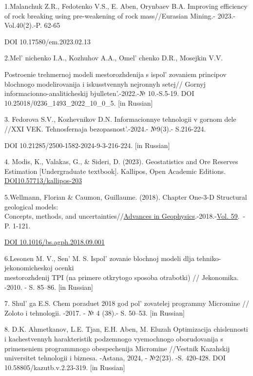 \begin{references}

1.Malanchuk Z.R., Fedotenko V.S., E. Aben, Orynbaev B.A. Improving
efficiency of rock breaking using pre-weakening of rock mass//Eurasian
Mining.- 2023.-Vol.40(2).-P. 62-65

DOI 10.17580/em.2023.02.13

2.Mel' nichenko I.A., Kozhuhov A.A.,
Omel' chenko D.R., Mosejkin V.V.

Postroenie trehmernoj modeli mestorozhdenija s
ispol' zovaniem principov blochnogo modelirovanija i
iskusstvennyh nejronnyh setej// Gornyj informacionno-analiticheskij
bjulleten'.-2022.-№ 10.-S.5-19. DOI
10.25018/0236\_1493\_2022\_10\_0\_5. {[}in Russian{]}

3. Fedorova S.V., Kozhevnikov D.N. Informacionnye tehnologii v gornom
dele //XXI VEK. Tehnosfernaja bezopasnost'.-2024.-
№9(3).- S.216-224.

DOI 10.21285/2500-1582-2024-9-3-216-224. {[}in Russian{]}

4. Modis, K., Valakas, G., \& Sideri, D. (2023). Geostatistics and Ore
Reserves Estimation {[}Undergraduate textbook{]}. Kallipos, Open
Academic Editions.
\href{http://dx.doi.org/10.57713/kallipos-203}{DOI10.57713/kallipos-203}

5.Wellmann, Florian \& Caumon, Guillaume. (2018). Chapter One-3-D
Structural geological models:\\ Concepts, methods, and
uncertainties//\href{https://www.sciencedirect.com/bookseries/advances-in-geophysics}{Advances
in
Geophysics}.-2018.-\href{https://www.sciencedirect.com/bookseries/advances-in-geophysics/vol/59/suppl/C}{Vol.
59}.~- P. 1-121.

\href{http://dx.doi.org/10.1016/bs.agph.2018.09.001}{DOI
10.1016/bs.agph.2018.09.001} \hl{}

6.Lesonen M. V., Sen'{} M. S.
Ispol' zovanie blochnoj modeli dlja
tehniko-jekonomicheskoj ocenki \\mestorozhdenij TPI (na primere otkrytogo
sposoba otrabotki) // Jekonomika. -2010. - S. 85--86. {[}in Russian{]}

7. Shul' ga E.S. Chem poraduet 2018 god
pol' zovatelej programmy Micromine // Zoloto i
tehnologii. -2017. - № 4 (38).- S. 50--53. {[}in Russian{]}

8. D.K. Ahmetkanov, L.E. Tjan, E.H. Aben, M. Eluzah Optimizacija
chislennosti i kachestvennyh harakteristik podzemnogo vyemochnogo
oborudovanija s primeneniem programmnogo obespechenija Micromine
//Vestnik Kazahskij universitet tehnologii i biznesa. -Astana, 2024, -
№2(23). -S. 420-428. DOI 10.58805/kazutb.v.2.23-319. {[}in Russian{]}


\end{references}

